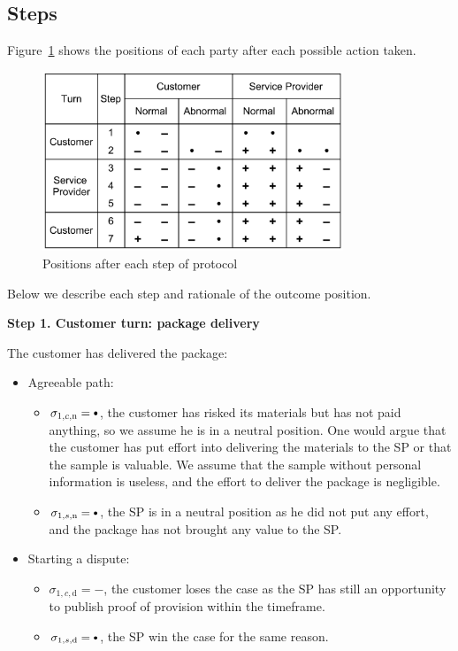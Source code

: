 \documentclass{ieeeaccess}
\newcommand\sbullet[1][.75]{\mathbin{\ThisStyle{\vcenter{\hbox{%
  \scalebox{#1}{$\SavedStyle\bullet$}}}}}%
}
\begin{document}
\subsection{Steps}\label{steps}

Figure~\ref{fig:positions} shows the positions of each party after each possible action taken.

\begin{figure}[h!]
\includegraphics[width=9cm]{formal-table-of-positions.png}
\centering
\caption{Positions after each step of protocol}
\label{fig:positions}
\end{figure}


Below we describe each step and rationale of the outcome position.

\noindent \textbf
{Step 1. Customer turn: package delivery}\label{step-1-deliver-package}

The customer has delivered the package:

\begin{itemize}
\item
  Agreeable path:

  \begin{itemize}
  
  \item
    \(\sigma_{1, c, \mathrm{n}} = \sbullet\), the customer has risked its materials but has not paid anything, so we assume he is in a neutral position. One would argue that the customer has put effort into delivering the materials to the SP or that the sample is valuable. We assume that the sample without personal information is useless, and the effort to deliver the package is negligible.
  \item
    \(\sigma_{1, s, \mathrm{n}} = \sbullet\), the SP is in a neutral position as he did not put any effort, and the package has not brought any value to the SP.
  \end{itemize}
\item
  Starting a dispute:

  \begin{itemize}
  
  \item
    \(\sigma_{1, c, \mathrm{d}} = -\), the customer loses the case as the SP has still an opportunity to publish proof of provision within the timeframe.
  \item
    \(\sigma_{1, s, \mathrm{d}} = \sbullet\), the SP win the case for the same reason.
  \end{itemize}
\end{itemize}
\end{document}
